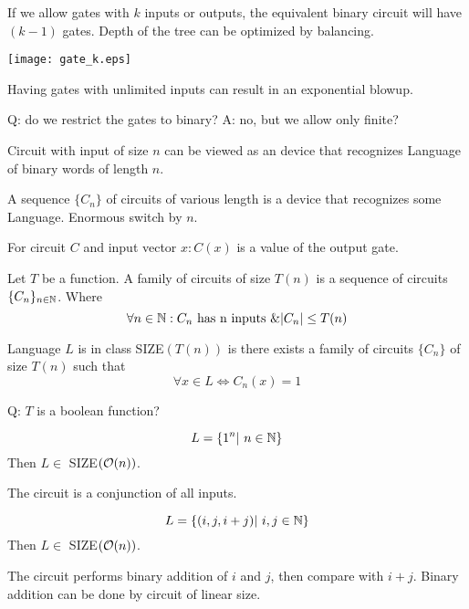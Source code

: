 \begin{observation}
	If we allow gates with $k$ inputs or outputs, the equivalent binary circuit will have $(k - 1)$ gates.
	Depth of the tree can be optimized by balancing.

	\texttt{[image: gate\_k.eps]}
\end{observation}

\begin{note}
	Having gates with unlimited inputs can result in an exponential blowup.
\end{note}

Q: do we restrict the gates to binary? A: no, but we allow only finite?

\begin{note}
	Circuit with input of size $n$ can be viewed as an device that recognizes Language of binary words of length $n$.

	A sequence $\{C_n\}$ of circuits of various length is a device that recognizes some Language.
	Enormous switch by $n$.
\end{note}

\begin{notation}
	For circuit $C$ and input vector $x: C(x)$ is a value of the output gate.
\end{notation}

\begin{definition}
	Let $T$ be a function. A family of circuits of size $T(n)$ is a sequence of circuits $\{C_n\}_{n \in \operatorname{\mathbb{N}}}$.
	Where
	\[ \forall n \in \N: C_n\ \text{has n inputs}\ \& |C_n| \leq T(n) \]

	Language $L$ is in class SIZE$(T(n))$ is there exists a family of circuits $\{C_n\}$ of size $T(n)$ such that
	\[ \forall x \in L \iff C_n(x) = 1 \]
\end{definition}

Q: $T$ is a boolean function?

\begin{example}
	\[ L = \{ 1^n |\ n \in \operatorname{\mathbb{N}} \} \]
	Then $L \in $ SIZE$(\mathcal{O}(n))$.

	The circuit is a conjunction of all inputs.
\end{example}

\begin{example}
	\[ L = \{ (i, j, i + j) |\ i, j \in \operatorname{\mathbb{N}} \} \]
	Then $L \in $ SIZE$(\mathcal{O}(n))$.

	The circuit performs binary addition of $i$ and $j$, then compare with $i + j$.
	Binary addition can be done by circuit of linear size.
\end{example}

